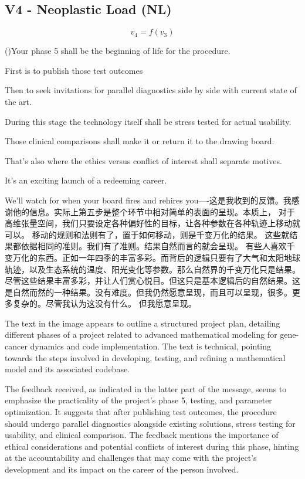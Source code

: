 \documentclass{article}
\begin{document}
\subsection{V4 - Neoplastic Load (NL)}
\begin{equation}
    v_4 = f(v_3)
\end{equation}


()Your phase 5 shall be the beginning of life for the procedure.

First is to publish those test outcomes

Then to seek invitations for parallel diagnostics side by side with current state of the art.

During this stage the technology itself shall be stress tested for actual usability.

Those clinical comparisons shall make it or return it to the drawing board.

That's also where the ethics versus conflict of interest shall separate motives.

It's an exciting launch of a redeeming career.

We'll watch for when your board fires and rehires you----这是我收到的反馈。我感谢他的信息。实际上第五步是整个环节中相对简单的表面的呈现。本质上， 对于高维张量空间，我们只要设定各种偏好性的目标，让各种参数在各种轨迹上移动就可以。 移动的规则和法则有了，置于如何移动，则是千变万化的结果。 这些就结果都依据相同的准则。我们有了准则。结果自然而言的就会呈现。 有些人喜欢千变万化的东西。正如一年四季的丰富多彩。而背后的逻辑只要有了大气和太阳地球轨迹，以及生态系统的温度、阳光变化等参数。那么自然界的千变万化只是结果。 尽管这些结果丰富多彩，并让人们赏心悦目。但这只是基本逻辑后的自然结果。这是自然而然的一种结果。没有难度。但我仍然愿意呈现，而且可以呈现，很多。更多复杂的。尽管我认为这没有什么。 但我愿意呈现。 


The text in the image appears to outline a structured project plan, detailing different phases of a project related to advanced mathematical modeling for gene-cancer dynamics and code implementation. The text is technical, pointing towards the steps involved in developing, testing, and refining a mathematical model and its associated codebase.

The feedback received, as indicated in the latter part of the message, seems to emphasize the practicality of the project's phase 5, testing, and parameter optimization. It suggests that after publishing test outcomes, the procedure should undergo parallel diagnostics alongside existing solutions, stress testing for usability, and clinical comparison. The feedback mentions the importance of ethical considerations and potential conflicts of interest during this phase, hinting at the accountability and challenges that may come with the project's development and its impact on the career of the person involved.
\end{document}
